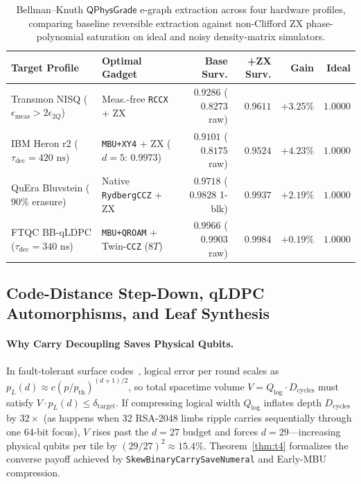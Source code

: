\documentclass[acmsmall,screen,anonymous]{acmart}
\DeclareRobustCommand{\_}{\ifmmode\text{\char95}\else\char95\penalty0\relax\fi}
\theoremstyle{plain}
\newcommand{\QPhysGrade}{\ensuremath{\mathsf{QPhysGrade}}}
\begin{document}
\begin{table}[t]
\centering
\caption{Bellman--Knuth $\QPhysGrade$ e-graph extraction across four hardware profiles, comparing baseline reversible extraction against non-Clifford ZX phase-polynomial saturation on ideal and noisy density-matrix simulators.}
\label{tab:t13}
\footnotesize
\setlength{\tabcolsep}{4pt}
\begin{tabular}{llrrrr}
\toprule
Target Profile & Optimal Gadget & Base Surv. & +ZX Surv. & Gain & Ideal \\
\midrule
Transmon NISQ ($\epsilon_{\mathrm{meas}} > 2\epsilon_{2Q}$) & Meas.-free \texttt{RCCX} + ZX & $0.9286$ ($0.8273$ raw) & $0.9611$ & $+3.25\%$ & $1.0000$ \\
IBM Heron r2 ($\tau_{\mathrm{dec}} = 420\text{ ns}$) & \texttt{MBU+XY4} + ZX ($d{=}5$: $0.9973$) & $0.9101$ ($0.8175$ raw) & $0.9524$ & $+4.23\%$ & $1.0000$ \\
QuEra Bluvstein ($90\%$ erasure) & Native \texttt{RydbergCCZ} + ZX & $0.9718$ ($0.9828$ 1-blk) & $0.9937$ & $+2.19\%$ & $1.0000$ \\
FTQC BB-qLDPC ($\tau_{\mathrm{dec}} = 340\text{ ns}$) & \texttt{MBU+QROAM} + Twin-\texttt{CCZ} ($8T$) & $0.9966$ ($0.9903$ raw) & $0.9984$ & $+0.19\%$ & $1.0000$ \\
\bottomrule
\end{tabular}
\end{table}

\subsection{Code-Distance Step-Down, qLDPC Automorphisms, and Leaf Synthesis}
\label{sec:stepdown}

\paragraph{Why Carry Decoupling Saves Physical Qubits.}
In fault-tolerant surface codes~\cite{litinski2019,gidneyekera2021}, logical error per round scales as $p_L(d) \approx c (p / p_{\mathrm{th}})^{(d+1)/2}$, so total spacetime volume $V = Q_{\mathrm{log}} \cdot D_{\mathrm{cycles}}$ must satisfy $V \cdot p_L(d) \le \delta_{\mathrm{target}}$. If compressing logical width $Q_{\mathrm{log}}$ inflates depth $D_{\mathrm{cycles}}$ by $32\times$ (as happens when 32 RSA-2048 limbs ripple carries sequentially through one 64-bit focus), $V$ rises past the $d = 27$ budget and forces $d = 29$---increasing physical qubits per tile by $(29/27)^2 \approx 15.4\%$. Theorem~\ref{thm:t4} formalizes the converse payoff achieved by \texttt{SkewBinaryCarrySaveNumeral} and Early-MBU compression.
\end{document}

